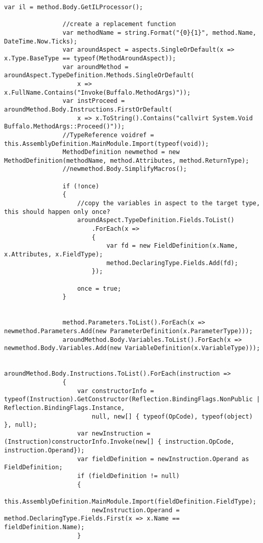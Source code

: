 \begin{lstlisting}[caption={../buffalo/Weaver.cs}, label=../buffalo/Weaver.cs, frame=tb, basicstyle=\scriptsize]
                var il = method.Body.GetILProcessor();

                //create a replacement function
                var methodName = string.Format("{0}{1}", method.Name, DateTime.Now.Ticks);
                var aroundAspect = aspects.SingleOrDefault(x => x.Type.BaseType == typeof(MethodAroundAspect));
                var aroundMethod = aroundAspect.TypeDefinition.Methods.SingleOrDefault(
                    x => x.FullName.Contains("Invoke(Buffalo.MethodArgs)"));
                var instProceed = aroundMethod.Body.Instructions.FirstOrDefault(
                    x => x.ToString().Contains("callvirt System.Void Buffalo.MethodArgs::Proceed()"));
                //TypeReference voidref = this.AssemblyDefinition.MainModule.Import(typeof(void));
                MethodDefinition newmethod = new MethodDefinition(methodName, method.Attributes, method.ReturnType);
                //newmethod.Body.SimplifyMacros();

                if (!once)
                {
                    //copy the variables in aspect to the target type, this should happen only once?
                    aroundAspect.TypeDefinition.Fields.ToList()
                        .ForEach(x =>
                        {
                            var fd = new FieldDefinition(x.Name, x.Attributes, x.FieldType);                            
                            method.DeclaringType.Fields.Add(fd);
                        });

                    once = true;
                }


                method.Parameters.ToList().ForEach(x => newmethod.Parameters.Add(new ParameterDefinition(x.ParameterType)));
                aroundMethod.Body.Variables.ToList().ForEach(x => newmethod.Body.Variables.Add(new VariableDefinition(x.VariableType)));
                
                aroundMethod.Body.Instructions.ToList().ForEach(instruction =>
                {
                    var constructorInfo = typeof(Instruction).GetConstructor(Reflection.BindingFlags.NonPublic | Reflection.BindingFlags.Instance, 
                        null, new[] { typeof(OpCode), typeof(object) }, null);
                    var newInstruction = (Instruction)constructorInfo.Invoke(new[] { instruction.OpCode, instruction.Operand});
                    var fieldDefinition = newInstruction.Operand as FieldDefinition;
                    if (fieldDefinition != null)
                    {
                        this.AssemblyDefinition.MainModule.Import(fieldDefinition.FieldType);
                        newInstruction.Operand = method.DeclaringType.Fields.First(x => x.Name == fieldDefinition.Name);
                    }


\end{lstlisting}

